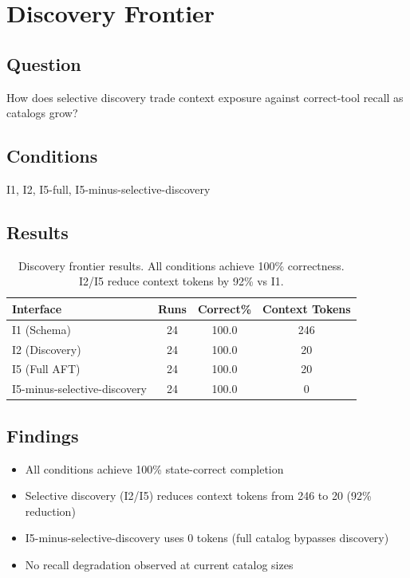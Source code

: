 
\section{Discovery Frontier}

\subsection{Question}
How does selective discovery trade context exposure against correct-tool recall as catalogs grow?

\subsection{Conditions}
I1, I2, I5-full, I5-minus-selective-discovery

\subsection{Results}

\begin{table}[h]
\centering
\begin{tabular}{lccc}
\hline
\textbf{Interface} & \textbf{Runs} & \textbf{Correct\%} & \textbf{Context Tokens} \\
\hline
I1 (Schema) & 24 & 100.0 & 246 \\
I2 (Discovery) & 24 & 100.0 & 20 \\
I5 (Full AFT) & 24 & 100.0 & 20 \\
I5-minus-selective-discovery & 24 & 100.0 & 0 \\
\hline
\end{tabular}
\caption{Discovery frontier results. All conditions achieve 100\% correctness. I2/I5 reduce context tokens by 92\% vs I1.}
\label{tab:discovery_frontier}
\end{table}

\subsection{Findings}
\begin{itemize}
    \item All conditions achieve 100\% state-correct completion
    \item Selective discovery (I2/I5) reduces context tokens from 246 to 20 (92\% reduction)
    \item I5-minus-selective-discovery uses 0 tokens (full catalog bypasses discovery)
    \item No recall degradation observed at current catalog sizes
\end{itemize}

